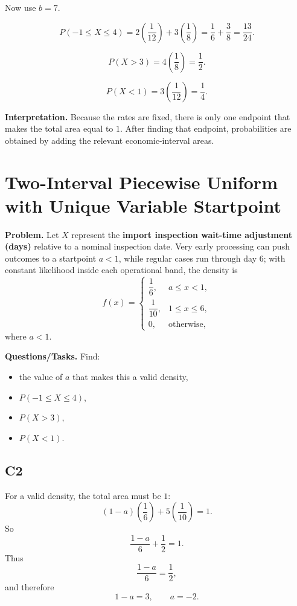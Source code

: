 Now use $b=7$.

\[
P(-1\le X\le 4)=2\left(\frac{1}{12}\right)+3\left(\frac{1}{8}\right)
=\frac{1}{6}+\frac{3}{8}
=\frac{13}{24}.
\]

\[
P(X>3)=4\left(\frac{1}{8}\right)=\frac{1}{2}.
\]

\[
P(X<1)=3\left(\frac{1}{12}\right)=\frac{1}{4}.
\]


\textbf{Interpretation.}
Because the rates are fixed, there is only one endpoint that makes the total area equal to $1$. After finding that endpoint, probabilities are obtained by adding the relevant economic-interval areas.

\section{Two-Interval Piecewise Uniform with Unique Variable Startpoint}

\textbf{Problem.}
Let $X$ represent the \textbf{import inspection wait-time adjustment (days)} relative to a nominal inspection date. Very early processing can push outcomes to a startpoint $a<1$, while regular cases run through day 6; with constant likelihood inside each operational band, the density is
\[
f(x)=
\begin{cases}
	\dfrac{1}{6}, & a\le x<1,\\[4pt]
	\dfrac{1}{10}, & 1\le x\le 6,\\[4pt]
	0, & \text{otherwise,}
\end{cases}
\]
where $a<1$.

\textbf{Questions/Tasks.}
Find:
\begin{itemize}
	\item[(a)] the value of $a$ that makes this a valid density,
	\item[(b)] $P(-1\le X\le 4)$,
	\item[(c)] $P(X>3)$,
	\item[(d)] $P(X<1)$.
\end{itemize}

\subsection*{C2}
For a valid density, the total area must be $1$:
\[
(1-a)\left(\frac{1}{6}\right)+5\left(\frac{1}{10}\right)=1.
\]
So
\[
\frac{1-a}{6}+\frac{1}{2}=1.
\]
Thus
\[
\frac{1-a}{6}=\frac{1}{2},
\]
and therefore
\[
1-a=3,
\qquad
a=-2.
\]

